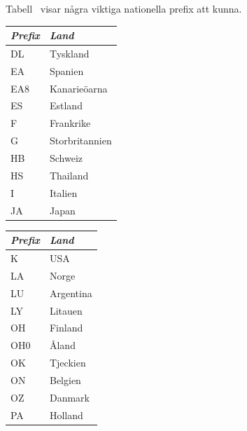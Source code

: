 Tabell~ visar några viktiga nationella prefix att kunna.

\begin{table}[ht]
  \begin{center}
    \begin{minipage}{.3\linewidth}
      \begin{tabular}{ll}
        \emph{Prefix} & \emph{Land} \\
        \hline
        DL            & Tyskland    \\
        EA            & Spanien        \\
        EA8           & Kanarieöarna   \\
        ES            & Estland     \\
        F             & Frankrike   \\
        G             & Storbritannien \\
        HB            & Schweiz     \\
        HS            & Thailand    \\
        I             & Italien     \\
        JA            & Japan          \\
      \end{tabular}
    \end{minipage}
    \begin{minipage}{.3\linewidth}
      \begin{tabular}{ll}
        \emph{Prefix} & \emph{Land} \\
        \hline
        K             & USA         \\
        LA            & Norge       \\
        LU            & Argentina      \\
        LY            & Litauen        \\
        OH            & Finland     \\
        OH0           & Åland          \\
        OK            & Tjeckien    \\
        ON            & Belgien     \\
        OZ            & Danmark     \\
        PA            & Holland        \\
      \end{tabular}
    \end{minipage}
    \begin{minipage}{.3\linewidth}

\end{minipage}
\end{center}
\end{table}
